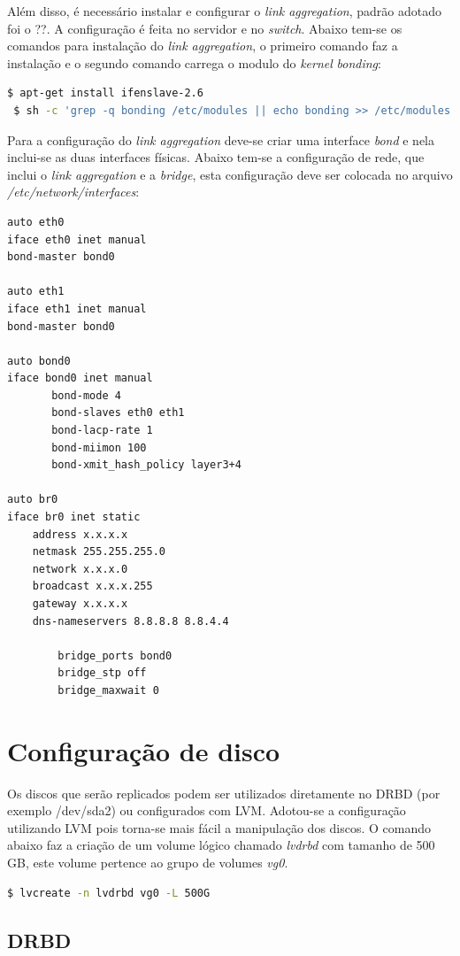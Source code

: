 Além disso, é necessário instalar e configurar o \textit{link aggregation}, padrão adotado foi o ??. A configuração é feita no servidor e 
no \textit{switch}. Abaixo tem-se os comandos para instalação do \textit{link aggregation}, o primeiro comando faz a instalação
e o segundo comando carrega o modulo do \textit{kernel} \textit{bonding}:
\begin{lstlisting}[language=bash]
 $ apt-get install ifenslave-2.6
 $ sh -c 'grep -q bonding /etc/modules || echo bonding >> /etc/modules'
\end{lstlisting}

Para a configuração do \textit{link aggregation} deve-se criar uma interface \textit{bond} e nela inclui-se as duas interfaces físicas.
Abaixo tem-se a configuração de rede, que inclui o \textit{link aggregation} e a \textit{bridge}, esta configuração deve ser colocada no 
arquivo \textit{/etc/network/interfaces}:
\begin{lstlisting}[language=bash]
auto eth0
iface eth0 inet manual
bond-master bond0

auto eth1
iface eth1 inet manual
bond-master bond0

auto bond0
iface bond0 inet manual
       bond-mode 4
       bond-slaves eth0 eth1
       bond-lacp-rate 1
       bond-miimon 100
       bond-xmit_hash_policy layer3+4

auto br0
iface br0 inet static
	address x.x.x.x
	netmask 255.255.255.0
	network x.x.x.0
	broadcast x.x.x.255
	gateway x.x.x.x
	dns-nameservers 8.8.8.8 8.8.4.4
	
        bridge_ports bond0
        bridge_stp off
        bridge_maxwait 0
\end{lstlisting}

\section{Configuração de disco}

Os discos que serão replicados podem ser utilizados diretamente no \ac{DRBD} (por exemplo /dev/sda2) ou configurados com \ac{LVM}. Adotou-se
a configuração utilizando \ac{LVM} pois torna-se mais fácil a manipulação dos discos. O comando abaixo faz a criação de um volume lógico chamado 
\textit{lvdrbd} com tamanho de 500 GB, este volume pertence ao grupo de volumes \textit{vg0}.
\begin{lstlisting}[language=bash]
 $ lvcreate -n lvdrbd vg0 -L 500G
\end{lstlisting}

\subsection{DRBD}

